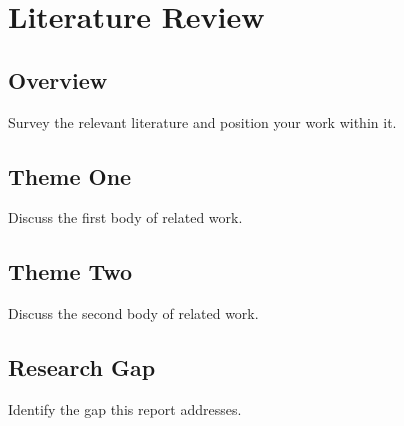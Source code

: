 \chapter{Literature Review}
\label{ch:litreview}

\section{Overview}
\label{sec:lit-overview}

Survey the relevant literature and position your work within it.

\section{Theme One}
\label{sec:lit-theme1}

Discuss the first body of related work.

\section{Theme Two}
\label{sec:lit-theme2}

Discuss the second body of related work.

\section{Research Gap}
\label{sec:lit-gap}

Identify the gap this report addresses.
